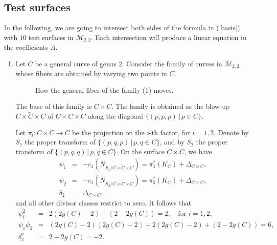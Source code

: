 \documentclass[10pt]{amsart}
\theoremstyle{definition}
\begin{document}
\subsection{Test surfaces}
\label{testsurfaces}

In the following, we are going to intersect both sides of the formula in (\ref{basis}) with $10$ test surfaces in ${\overline{\mathcal{M}}}_{2,2}$. Each intersection will produce a linear equation in the coefficients $A$. 
{\setlength{\leftmargini}{0pt} 
\begin{enumerate}

\item \label{9} Let $C$ be a general curve of genus $2$. Consider the family of curves in ${\overline{\mathcal{M}}}_{2,2}$ whose fibers are obtained by varying two points in $C$. 

\begin{figure}[htbp]
\centering
  
  

  \caption{How the general fiber of the family (1) moves.}
\end{figure}

The base of this family is $C\times C$. The family is obtained as the blow-up $\widetilde{C\times C \times C}$ of $C\times C\times C$ along the diagonal $\{(p,p,p) \,|\, p\in C \}$.

Let $\pi_i \colon C\times C\rightarrow C$ be the projection on the $i$-th factor, for $i=1,2$. Denote by $S_1$ the proper transform of $\{(p,q,p)\,|\, p,q\in C\}$, and by $S_2$ the proper transform of $\{(p,q,q)\,|\, p,q\in C\}$. On the surface $C\times C$, we have
\begin{eqnarray*}
\psi_1 &=& -c_1\left(N_{S_1/\widetilde{C\times C \times C}}\right) = \pi_1^*(K_C)+\Delta_{C\times C},\\
\psi_2 &=& -c_1\left(N_{S_2/\widetilde{C\times C \times C}}\right) = \pi_2^*(K_C)+\Delta_{C\times C},\\
\delta_2 &=& \Delta_{C\times C},
\end{eqnarray*}
and all other divisor classes restrict to zero. It follows that
\begin{eqnarray*}
\psi_i^2 &=& 2(2g(C)-2)+(2-2g(C))=2, \quad \mbox{for}\,\, i=1,2,\\
\psi_1\psi_2 &=& (2g(C)-2)(2g(C)-2) +2(2g(C)-2) +(2-2g(C))=6,\\
\delta_2^2 &=& 2-2g(C) =-2.
\end{eqnarray*}


\end{enumerate}}
\end{document}
